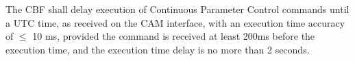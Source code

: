 The CBF shall delay execution of Continuous Parameter Control commands until
a UTC time, as received on the CAM interface, with an execution time
accuracy of $\le$ 10 ms, provided the command is received at least 200ms
before the execution time, and the execution time delay is no more than
2 seconds.
